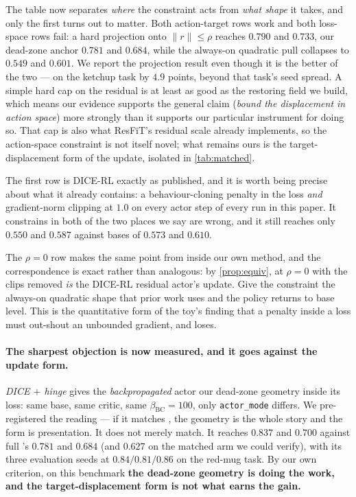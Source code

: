 The table now separates \emph{where} the constraint acts from \emph{what
shape} it takes, and only the first turns out to matter. Both action-target
rows work and both loss-space rows fail: a hard projection onto
$\|r\|\le\rho$ reaches $0.790$ and $0.733$, our dead-zone anchor $0.781$ and
$0.684$, while the always-on quadratic pull collapses to $0.549$ and
$0.601$. We report the projection result even though it is the better of the
two --- on the ketchup task by $4.9$ points, beyond that task's seed
spread. A simple hard cap on the residual is at least as good as the
restoring field we build, which means our evidence supports the general
claim (\emph{bound the displacement in action space}) more strongly than it
supports our particular instrument for doing so. That cap is also what
ResFiT's residual scale already implements, so the action-space constraint
is not itself novel; what remains ours is the target-displacement form of
the update, isolated in \cref{tab:matched}.

The first row is DICE-RL exactly as
published, and it is worth being precise about what it already contains: a
behaviour-cloning penalty in the loss \emph{and} gradient-norm clipping at
$1.0$ on every actor step of every run in this paper. It constrains in both
of the two places we say are wrong, and it still reaches only $0.550$ and
$0.587$ against bases of $0.573$ and $0.610$.

The $\rho{=}0$ row makes the same point from inside our own method, and the
correspondence is exact rather than analogous: by \cref{prop:equiv},
\method{} at $\rho{=}0$ with the clips removed \emph{is} the DICE-RL
residual actor's update. Give the constraint the always-on quadratic shape
that prior work uses and the policy returns to base level. This is the
quantitative form of the toy's finding that a penalty inside a loss must
out-shout an unbounded gradient, and loses.

\paragraph{The sharpest objection is now measured, and it goes against the
update form.} \emph{DICE $+$ hinge} gives the \emph{backpropagated} actor our
dead-zone geometry inside its loss: same base, same critic, same
$\beta_{\mathrm{BC}}{=}100$, only \texttt{actor\_mode} differs. We
pre-registered the reading --- if it matches \method{}, the geometry is the
whole story and the form is presentation. It does not merely match. It
reaches $0.837$ and $0.700$ against full \method{}'s $0.781$ and $0.684$
(and $0.627$ on the matched arm we could verify), with its three evaluation
seeds at $0.84/0.81/0.86$ on the red-mug task. By our own criterion, on this
benchmark \textbf{the dead-zone geometry is doing the work, and the
target-displacement form is not what earns the gain.}

